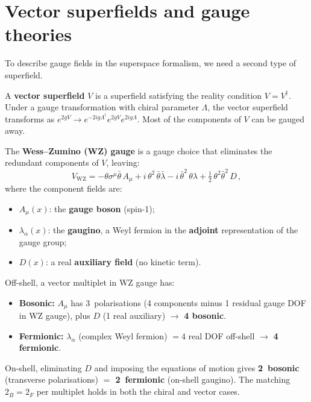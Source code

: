 \documentclass[11pt,a4paper]{article}
\begin{document}
\section{Vector superfields and gauge theories}
\label{sec:vector}

To describe gauge fields in the superspace formalism, we need a second
type of superfield.

\begin{definition}
\label{def:vector-superfield}
A \textbf{vector superfield} $V$ is a superfield satisfying the reality
condition $V = V^\dagger$.  Under a gauge transformation with chiral
parameter $\Lambda$, the vector superfield transforms as
$e^{2gV} \to e^{-2ig\Lambda^\dagger} e^{2gV} e^{2ig\Lambda}$.
Most of the components of $V$ can be gauged away.
\end{definition}

\begin{definition}
\label{def:wz-gauge}
The \textbf{Wess--Zumino (WZ) gauge} is a gauge choice that eliminates
the redundant components of $V$, leaving:
\begin{equation}
  \boxed{
    V_{\mathrm{WZ}} = -\theta \sigma^\mu \bar\theta\, A_\mu
    + i\,\theta^2\, \bar\theta \bar\lambda
    - i\,\bar\theta^2\, \theta \lambda
    + \tfrac{1}{2}\,\theta^2 \bar\theta^2\, D\,,
  }
  \label{eq:vector-WZ}
\end{equation}
where the component fields are:
\begin{itemize}
  \item $A_\mu(x)$: the \textbf{gauge boson} (spin-1);
  \item $\lambda_\alpha(x)$: the \textbf{gaugino}, a Weyl fermion in
    the \textbf{adjoint} representation of the gauge group;
  \item $D(x)$: a real \textbf{auxiliary field} (no kinetic term).
\end{itemize}
\end{definition}

\begin{remark}
\label{rem:vector-dof}
Off-shell, a vector multiplet in WZ gauge has:
\begin{itemize}
  \item \textbf{Bosonic:} $A_\mu$ has 3~polarisations (4 components minus
    1 residual gauge DOF in WZ gauge), plus $D$ (1 real auxiliary)
    $\to$ \textbf{4 bosonic}.
  \item \textbf{Fermionic:} $\lambda_\alpha$ (complex Weyl fermion)
    $= 4$ real DOF off-shell $\to$ \textbf{4 fermionic}.
\end{itemize}
On-shell, eliminating $D$ and imposing the equations of motion gives
\textbf{2~bosonic} (transverse polarisations) \textbf{$=$ 2~fermionic}
(on-shell gaugino).  The matching $2_B = 2_F$ per multiplet holds in
both the chiral and vector cases.
\end{remark}
\end{document}
